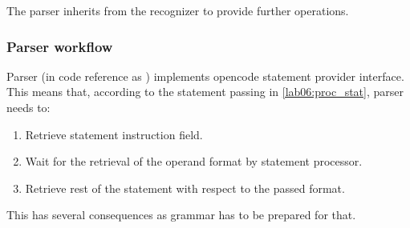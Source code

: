 The parser inherits from the recognizer to provide further operations.

\subsubsection{Parser workflow}

Parser (in code reference as ) implements opencode statement provider interface. This means that, according to the statement passing in \cref{lab06:proc_stat}, parser needs to:
\begin{enumerate}
	\item Retrieve statement instruction field.
	\item Wait for the retrieval of the operand format by statement processor.
	\item Retrieve rest of the statement with respect to the passed format.
\end{enumerate} 

This has several consequences as grammar has to be prepared for that.
